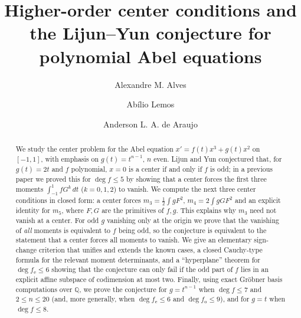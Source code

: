 \documentclass[11pt]{amsart}
\numberwithin{equation}{section}
\theoremstyle{plain}
\theoremstyle{definition}
\theoremstyle{remark}
\newcommand{\Q}{\mathbb{Q}}
\begin{document}
\title[Higher-order center conditions and the Lijun--Yun conjecture]
{Higher-order center conditions and the Lijun--Yun conjecture for polynomial Abel equations}

\author{Alexandre M. Alves}
\address{Departamento de Matem\'atica, CCE, Universidade Federal de Vi\c{c}osa,
Avenida PH Rolfs, s/n, Vi\c{c}osa, MG, CEP 36570-900, Brazil}

\author{Ab\'ilio Lemos}
\address{Departamento de Matem\'atica, CCE, Universidade Federal de Vi\c{c}osa,
Avenida PH Rolfs, s/n, Vi\c{c}osa, MG, CEP 36570-900, Brazil}

\author{Anderson L. A. de Araujo}
\address{Departamento de Matem\'atica, CCE, Universidade Federal de Vi\c{c}osa,
Avenida PH Rolfs, s/n, Vi\c{c}osa, MG, CEP 36570-900, Brazil}


\begin{abstract}
We study the center problem for the Abel equation
$x'=f(t)x^3+g(t)x^2$ on $[-1,1]$, with emphasis on $g(t)=t^{n-1}$, $n$ even.
Lijun and Yun conjectured that, for $g(t)=2t$ and $f$ polynomial, $x=0$ is a center
if and only if $f$ is odd; in a previous paper we proved this for
$\deg f\le5$ by showing that a center forces the first three moments
$\int_{-1}^1fG^k\,dt$ ($k=0,1,2$) to vanish. We compute the next three center
conditions in closed form: a center forces
$m_3=\tfrac12\int gF^2$, $m_4=2\int gGF^2$ and an explicit identity for $m_5$,
where $F,G$ are the primitives of $f,g$. This explains why $m_3$ need not vanish at a
center. For odd $g$ vanishing only at the origin we prove that the vanishing of
\emph{all} moments is equivalent to $f$ being odd, so the conjecture is
equivalent to the statement that a center forces all moments to vanish. We give an
elementary sign-change criterion that unifies and extends the known cases, a closed
Cauchy-type formula for the relevant moment determinants, and a ``hyperplane''
theorem for $\deg f_{\mathrm e}\le 6$ showing that the conjecture can only fail if the odd part of $f$
lies in an explicit affine subspace of codimension at most two. Finally, using
exact Gr\"obner basis computations over $\Q$,
we prove the conjecture for $g=t^{n-1}$ when $\deg f\le 7$ and $2\le n\le 20$ (and,
more generally, when $\deg f_{\mathrm e}\le6$ and $\deg f_{\mathrm o}\le9$), and
for $g=t$ when $\deg f\le 8$.
\end{abstract}
\end{document}
